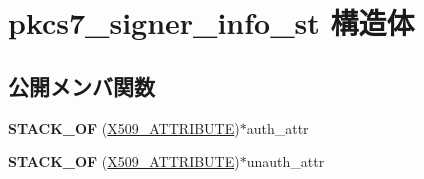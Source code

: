 \hypertarget{structpkcs7__signer__info__st}{}\section{pkcs7\+\_\+signer\+\_\+info\+\_\+st 構造体}
\label{structpkcs7__signer__info__st}
\subsection*{公開メンバ関数}
\begin{DoxyCompactItemize}
\item 
\hypertarget{structpkcs7__signer__info__st_a3b91e56502966ae1bdf987264c22d354}{}{\bfseries S\+T\+A\+C\+K\+\_\+\+O\+F} (\hyperlink{structx509__attributes__st}{X509\+\_\+\+A\+T\+T\+R\+I\+B\+U\+T\+E})$\ast$auth\+\_\+attr\label{structpkcs7__signer__info__st_a3b91e56502966ae1bdf987264c22d354}

\item 
\hypertarget{structpkcs7__signer__info__st_abaa0f2abfc6e310a35f1093d01c4bb21}{}{\bfseries S\+T\+A\+C\+K\+\_\+\+O\+F} (\hyperlink{structx509__attributes__st}{X509\+\_\+\+A\+T\+T\+R\+I\+B\+U\+T\+E})$\ast$unauth\+\_\+attr\label{structpkcs7__signer__info__st_abaa0f2abfc6e310a35f1093d01c4bb21}

\end{DoxyCompactItemize}
